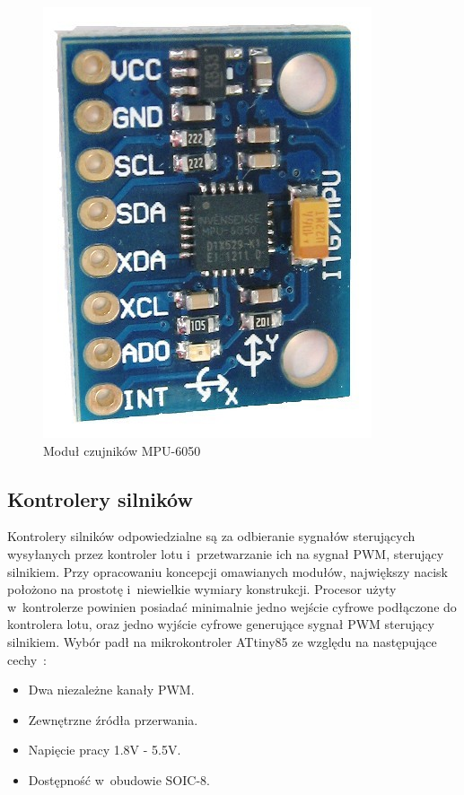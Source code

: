 \documentclass[11pt, twoside]{Thesis} %
\begin{document}
\begin{figure}[H]
	\centering
	\includegraphics[scale=0.6]{Pictures/mpu-6050.jpg}
		\caption[Moduł czujników MPU-6050]{Moduł czujników MPU-6050}
	\label{fig:mpu-6050}
\end{figure}

\subsection{Kontrolery silników}
Kontrolery silników odpowiedzialne są za odbieranie sygnałów sterujących wysyłanych przez kontroler lotu i~przetwarzanie ich na sygnał PWM, sterujący silnikiem. Przy opracowaniu koncepcji omawianych modułów, największy nacisk położono na prostotę i~niewielkie wymiary konstrukcji. Procesor użyty w~kontrolerze powinien posiadać minimalnie jedno wejście cyfrowe podłączone do kontrolera lotu, oraz jedno wyjście cyfrowe generujące sygnał PWM sterujący silnikiem. Wybór padł na mikrokontroler ATtiny85 ze względu na następujące cechy~\cite{ds_attiny85}:

\begin{itemize}
	\item Dwa niezależne kanały PWM.
	\item Zewnętrzne źródła przerwania.
	\item Napięcie pracy 1.8V - 5.5V.
	\item Dostępność w~obudowie SOIC-8.
\end{itemize}
\end{document}
